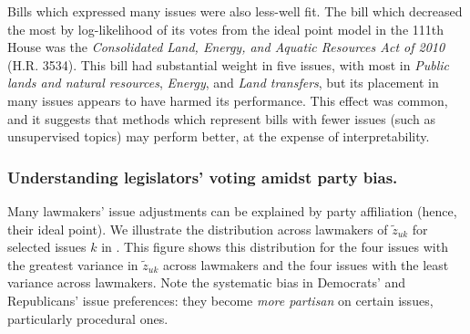Bills which expressed many issues were also less-well fit.  The bill
which decreased the most by log-likelihood of its votes from the ideal
point model in the 111th House was the \emph{Consolidated Land,
  Energy, and Aquatic Resources Act of 2010} (H.R. 3534).  This bill
had substantial weight in five issues, with most in \emph{Public lands
  and natural resources}, \emph{Energy}, and \emph{Land transfers},
but its placement in many issues appears to have harmed its
performance.  This effect was common, and it suggests that methods
which represent bills with fewer issues (such as unsupervised topics)
may perform better, at the expense of interpretability.

\subsubsection{Understanding legislators' voting amidst party bias.}
\label{sec:party_bias}
Many lawmakers' issue adjustments can be explained by party
affiliation (hence, their ideal point).  We illustrate the
distribution across lawmakers of $\tilde z_{uk}$ for selected issues
$k$ in .  This figure shows this
distribution for the four issues with the greatest variance in $\tilde
z_{uk}$ across lawmakers and the four issues with the least variance
across lawmakers. Note the systematic bias in Democrats' and
Republicans' issue preferences: they become \emph{more partisan} on
certain issues, particularly procedural ones.

